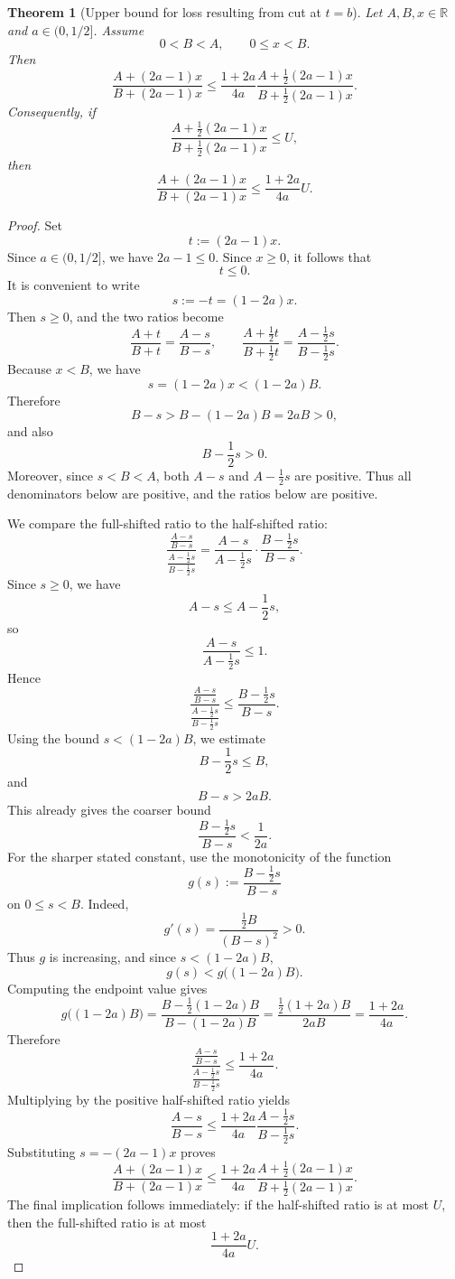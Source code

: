\documentclass[11pt]{article}
\newtheorem{theorem}{Theorem}
\begin{document}
\begin{theorem}[Upper bound for loss resulting from cut at $t=b$]
Let \(A,B,x\in\mathbb{R}\) and \(a\in(0,1/2]\). Assume
\[
    0 < B < A,
    \qquad
    0 \le x < B.
\]
Then
\[
    \frac{A+(2a-1)x}{B+(2a-1)x}
    \le
    \frac{1+2a}{4a}
    \frac{A+\frac12(2a-1)x}{B+\frac12(2a-1)x}.
\]
Consequently, if
\[
    \frac{A+\frac12(2a-1)x}{B+\frac12(2a-1)x}\le U,
\]
then
\[
    \frac{A+(2a-1)x}{B+(2a-1)x}
    \le
    \frac{1+2a}{4a}U.
\]
\end{theorem}

\begin{proof}
Set
\[
    t := (2a-1)x.
\]
Since \(a\in(0,1/2]\), we have \(2a-1\le 0\). Since \(x\ge 0\), it follows that
\[
    t\le 0.
\]
It is convenient to write
\[
    s := -t = (1-2a)x.
\]
Then \(s\ge 0\), and the two ratios become
\[
    \frac{A+t}{B+t}
    =
    \frac{A-s}{B-s},
    \qquad
    \frac{A+\frac12 t}{B+\frac12 t}
    =
    \frac{A-\frac12 s}{B-\frac12 s}.
\]
Because \(x<B\), we have
\[
    s=(1-2a)x < (1-2a)B.
\]
Therefore
\[
    B-s > B-(1-2a)B = 2aB > 0,
\]
and also
\[
    B-\frac12s > 0.
\]
Moreover, since \(s<B<A\), both \(A-s\) and \(A-\frac12s\) are positive.
Thus all denominators below are positive, and the ratios below are positive.

We compare the full-shifted ratio to the half-shifted ratio:
\[
    \frac{
        \frac{A-s}{B-s}
    }{
        \frac{A-\frac12 s}{B-\frac12 s}
    }
    =
    \frac{A-s}{A-\frac12 s}
    \cdot
    \frac{B-\frac12 s}{B-s}.
\]
Since \(s\ge 0\), we have
\[
    A-s \le A-\frac12s,
\]
so
\[
    \frac{A-s}{A-\frac12s}\le 1.
\]
Hence
\[
    \frac{
        \frac{A-s}{B-s}
    }{
        \frac{A-\frac12 s}{B-\frac12 s}
    }
    \le
    \frac{B-\frac12s}{B-s}.
\]
Using the bound \(s < (1-2a)B\), we estimate
\[
    B-\frac12s
    \le B,
\]
and
\[
    B-s > 2aB.
\]
This already gives the coarser bound
\[
    \frac{B-\frac12s}{B-s} < \frac{1}{2a}.
\]
For the sharper stated constant, use the monotonicity of the function
\[
    g(s) := \frac{B-\frac12s}{B-s}
\]
on \(0\le s<B\). Indeed,
\[
    g'(s)
    =
    \frac{\frac12B}{(B-s)^2}
    >0.
\]
Thus \(g\) is increasing, and since \(s < (1-2a)B\),
\[
    g(s)
    <
    g\bigl((1-2a)B\bigr).
\]
Computing the endpoint value gives
\[
    g\bigl((1-2a)B\bigr)
    =
    \frac{B-\frac12(1-2a)B}{B-(1-2a)B}
    =
    \frac{\frac12(1+2a)B}{2aB}
    =
    \frac{1+2a}{4a}.
\]
Therefore
\[
    \frac{
        \frac{A-s}{B-s}
    }{
        \frac{A-\frac12 s}{B-\frac12 s}
    }
    \le
    \frac{1+2a}{4a}.
\]
Multiplying by the positive half-shifted ratio yields
\[
    \frac{A-s}{B-s}
    \le
    \frac{1+2a}{4a}
    \frac{A-\frac12 s}{B-\frac12 s}.
\]
Substituting \(s=-(2a-1)x\) proves
\[
    \frac{A+(2a-1)x}{B+(2a-1)x}
    \le
    \frac{1+2a}{4a}
    \frac{A+\frac12(2a-1)x}{B+\frac12(2a-1)x}.
\]
The final implication follows immediately: if the half-shifted ratio is at most \(U\), then the full-shifted ratio is at most
\[
    \frac{1+2a}{4a}U.
\]
\end{proof}
\end{document}
